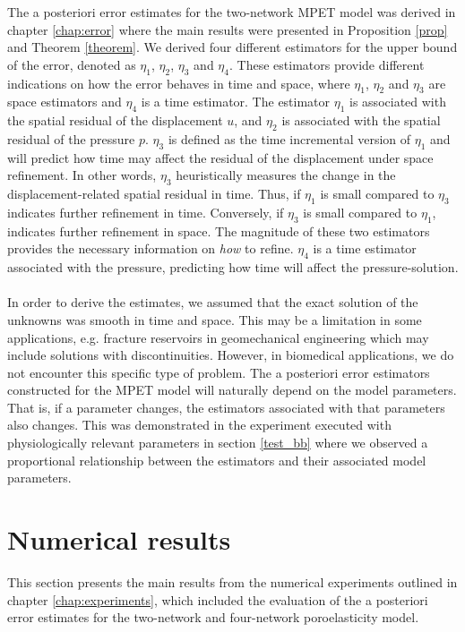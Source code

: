 The a posteriori error estimates for the two-network MPET model was derived in chapter \ref{chap:error} where the main results were presented in Proposition \ref{prop} and Theorem \ref{theorem}. We derived four different estimators for the upper bound of the error, denoted as $\eta_1$, $\eta_2$, $\eta_3$ and $\eta_4$. These estimators provide different indications on how the error behaves in time and space, where $\eta_1$, $\eta_2$ and $\eta_3$ are space estimators and $\eta_4$ is a time estimator. The estimator $\eta_1$ is associated with the spatial residual of the displacement $u$, and $\eta_2$ is associated with the spatial residual of the pressure $p$. $\eta_3$ is defined as the time incremental version of $\eta_1$ and will predict how time may affect the residual of the displacement under space refinement. In other words, $\eta_3$ heuristically measures the change in the displacement-related spatial residual in time. Thus, if $\eta_1$ is small compared to $\eta_3$ indicates further refinement in time. Conversely, if $\eta_3$ is small compared to $\eta_1$, indicates further refinement in space. The magnitude of these two estimators provides the necessary information on \textit{how} to refine. $\eta_4$ is a time estimator associated with the pressure, predicting how time will affect the pressure-solution.
\\
\\
In order to derive the estimates, we assumed that the exact solution of the unknowns was smooth in time and space. This may be a limitation in some applications, e.g. fracture reservoirs in geomechanical engineering which may include solutions with discontinuities. However, in biomedical applications, we do not encounter this specific type of problem. The a posteriori error estimators constructed for the MPET model will naturally depend on the model parameters. That is, if a parameter changes, the estimators associated with that parameters also changes. This was demonstrated in the experiment executed with physiologically relevant parameters in section  \ref{test_bb} where we observed a proportional relationship between the estimators and their associated model parameters.


\section{Numerical results} \label{section:mpet_numerical_res}
This section presents the main results from the numerical experiments outlined in chapter \ref{chap:experiments}, which included the evaluation of the a posteriori error estimates for the two-network and four-network poroelasticity model. 

